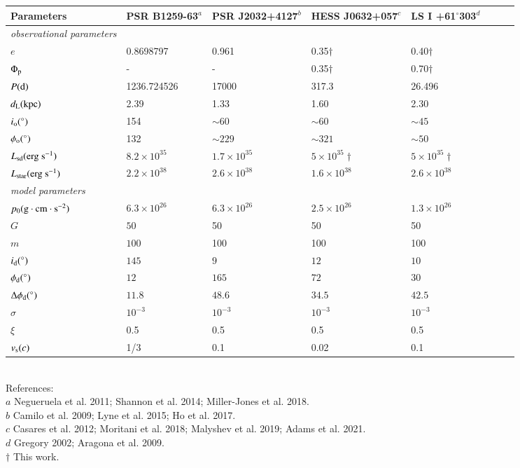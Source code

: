 \documentclass{aa}
\def\PSRB1259{PSR B1259-63/LS 2883}
\def\PSRJ2032{PSR J2032+4127/MT91 213}
\def\HESSJ0632{HESS J0632+057}
\def\LSI61{LS I +61$^{\circ}$303}
\begin{document}
\begin{table*}
\caption{Parameters of \PSRB1259, \PSRJ2032, \HESSJ0632, and \LSI61. \label{tab:para}}
\begin{tabular}{l l l l l l l l}
\hline
Parameters & PSR B1259-63$^a$ &PSR J2032+4127$^b$ &\HESSJ0632$^c$  &\LSI61$^d$ \\
\hline
\textit{observational parameters}\\
$e$ &  0.8698797 &0.961 &  0.35$\dag$  & 0.40$\dag$\\
$\Phi_{\rm p}$ &  - & - &  0.35$\dag$  & 0.70$\dag$\\
$P(\rm{d})$ &1236.724526 & 17000 &317.3  & 26.496\\
$d_{\rm L}(\rm{kpc})$ & 2.39 & 1.33 & 1.60  &2.30 \\
$i_{\rm o}(^{\circ})$ & 154 &$\sim60$ & $\sim60$ &$\sim45$ \\
$\phi_{\rm o}(^{\circ})$ & 132 & $\sim229$ & $\sim321$ &$\sim50$ \\
$L_{\rm sd}(\rm erg\ s^{-1})$  &  $8.2\times10^{35}$ &  $1.7\times10^{35}$ & $5\times10^{35}\dag$ &$5\times10^{35}\dag$\\
$L_{\rm star}(\rm erg\ s^{-1})$ &$2.2\times10^{38}$ &$2.6\times10^{38}$ & $1.6\times10^{38}$ &$2.6\times10^{38}$ \\

\hline
\textit{model parameters}\\
$p_0 (\rm{g\cdot cm\cdot s^{-2}})$  & $6.3\times 10^{26}$  & $6.3\times 10^{26}$ &
$2.5\times 10^{26}$ &$1.3\times 10^{26}$\\
$G$&   $50$ & 50& 50&50\\
$m$   &$100$  & 100& 100&100\\
$i_{\rm d}(^{\circ})$  &$145$  & $9$& $12$&$10$\\
$\phi_{\rm d}(^{\circ})$  &$12$  & $165$& $72$&$30$\\
$\Delta\phi_{\rm d}(^{\circ})$  &$11.8$  & $48.6$& $34.5$&$42.5$\\
$\sigma$  &$10^{-3}$  & $10^{-3}$ & $10^{-3}$&$10^{-3}$\\
$\xi$  &0.5  & 0.5& 0.5&0.5\\
$v_{\rm s}(c)$  &1/3  & 0.1& 0.02&0.1\\

\hline
\end{tabular}
\\
{{
\footnotesize
References: \\
$a$ Negueruela et al. 2011; Shannon et al. 2014; Miller-Jones et al. 2018.\\
$b$ Camilo et al. 2009; Lyne et al. 2015; Ho et al. 2017.\\
$c$ Casares et al. 2012; Moritani et al. 2018; Malyshev et al. 2019; Adams et al. 2021.\\
$d$ Gregory 2002; Aragona et al. 2009.\\ %
$\dag$ This work.
}}
\end{table*}
\end{document}
